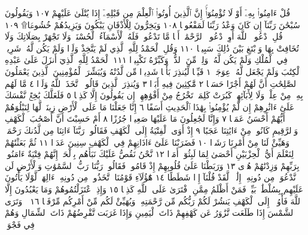قُلْ ءَامِنُوا۟ بِهِۦٓ أَوْ لَا تُؤْمِنُوٓا۟ۚ إِنَّ ٱلَّذِينَ أُوتُوا۟ ٱلْعِلْمَ مِن قَبْلِهِۦٓ إِذَا يُتْلَىٰ
عَلَيْهِمْ  ١٠٧ وَيَقُولُونَ سُبْحَٰنَ رَبِّنَآ إِن كَانَ
وَعْدُ رَبِّنَا لَمَفْعُولࣰا ١٠٨ وَيَخِرُّونَ لِلْأَذْقَانِ يَبْكُونَ وَيَزِيدُهُمْ
خُشُوعࣰا۩ ١٠٩ قُلِ ٱدْعُوا۟ ٱللَّهَ أَوِ ٱدْعُوا۟ ٱلرَّحْمَٰنَۖ أَيࣰّا مَّا تَدْعُوا۟ فَلَهُ
ٱلْأَسْمَآءُ ٱلْحُسْنَىٰۚ وَلَا تَجْهَرْ بِصَلَاتِكَ وَلَا تُخَافِتْ بِهَا وَٱبْتَغِ
بَيْنَ ذَٰلِكَ سَبِيلࣰا ١١٠ وَقُلِ ٱلْحَمْدُ لِلَّهِ ٱلَّذِي لَمْ يَتَّخِذْ وَلَدࣰا وَلَمْ يَكُن
لَّهُۥ شَرِيكࣱ فِي ٱلْمُلْكِ وَلَمْ يَكُن لَّهُۥ وَلِيࣱّ مِّنَ ٱلذُّلِّۖ وَكَبِّرْهُ تَكْبِيرَۢا ١١١
ٱلْحَمْدُ لِلَّهِ ٱلَّذِيٓ أَنزَلَ عَلَىٰ عَبْدِهِ ٱلْكِتَٰبَ وَلَمْ يَجْعَل لَّهُۥ عِوَجَاۜ ١
قَيِّمࣰا لِّيُنذِرَ بَأْسࣰا شَدِيدࣰا مِّن لَّدُنْهُ وَيُبَشِّرَ ٱلْمُؤْمِنِينَ
ٱلَّذِينَ يَعْمَلُونَ ٱلصَّٰلِحَٰتِ أَنَّ لَهُمْ أَجْرًا حَسَنࣰا ٢
مَّٰكِثِينَ فِيهِ أَبَدࣰا ٣ وَيُنذِرَ ٱلَّذِينَ قَالُوا۟ ٱتَّخَذَ ٱللَّهُ وَلَدࣰا ٤
مَّا لَهُم بِهِۦ مِنْ عِلْمࣲ وَلَا لِأٓبَآئِهِمْۚ كَبُرَتْ كَلِمَةࣰ تَخْرُجُ مِنْ
أَفْوَٰهِهِمْۚ إِن يَقُولُونَ إِلَّا كَذِبࣰا ٥ فَلَعَلَّكَ بَٰخِعࣱ نَّفْسَكَ
عَلَىٰٓ ءَاثَٰرِهِمْ إِن لَّمْ يُؤْمِنُوا۟ بِهَٰذَا ٱلْحَدِيثِ أَسَفًا ٦ إِنَّا
جَعَلْنَا مَا عَلَى ٱلْأَرْضِ زِينَةࣰ لَّهَا لِنَبْلُوَهُمْ أَيُّهُمْ أَحْسَنُ عَمَلࣰا ٧
وَإِنَّا لَجَٰعِلُونَ مَا عَلَيْهَا صَعِيدࣰا جُرُزًا ٨ أَمْ حَسِبْتَ
أَنَّ أَصْحَٰبَ ٱلْكَهْفِ وَٱلرَّقِيمِ كَانُوا۟ مِنْ ءَايَٰتِنَا عَجَبًا ٩
إِذْ أَوَى ٱلْفِتْيَةُ إِلَى ٱلْكَهْفِ فَقَالُوا۟ رَبَّنَآ ءَاتِنَا مِن لَّدُنكَ
رَحْمَةࣰ وَهَيِّئْ لَنَا مِنْ أَمْرِنَا رَشَدࣰا ١٠ فَضَرَبْنَا عَلَىٰٓ ءَاذَانِهِمْ
فِي ٱلْكَهْفِ سِنِينَ عَدَدࣰا ١١ ثُمَّ بَعَثْنَٰهُمْ لِنَعْلَمَ أَيُّ
ٱلْحِزْبَيْنِ أَحْصَىٰ لِمَا لَبِثُوٓا۟ أَمَدࣰا ١٢ نَّحْنُ نَقُصُّ عَلَيْكَ نَبَأَهُم
بِٱلْحَقِّۚ إِنَّهُمْ فِتْيَةٌ ءَامَنُوا۟ بِرَبِّهِمْ وَزِدْنَٰهُمْ هُدࣰى ١٣
وَرَبَطْنَا عَلَىٰ قُلُوبِهِمْ إِذْ قَامُوا۟ فَقَالُوا۟ رَبُّنَا رَبُّ ٱلسَّمَٰوَٰتِ
وَٱلْأَرْضِ لَن نَّدْعُوَا۟ مِن دُونِهِۦٓ إِلَٰهࣰاۖ لَّقَدْ قُلْنَآ إِذࣰا شَطَطًا ١٤
هَٰٓؤُلَآءِ قَوْمُنَا ٱتَّخَذُوا۟ مِن دُونِهِۦٓ ءَالِهَةࣰۖ لَّوْلَا يَأْتُونَ عَلَيْهِم
بِسُلْطَٰنِۭ بَيِّنࣲۖ فَمَنْ أَظْلَمُ مِمَّنِ ٱفْتَرَىٰ عَلَى ٱللَّهِ كَذِبࣰا ١٥
وَإِذِ ٱعْتَزَلْتُمُوهُمْ وَمَا يَعْبُدُونَ إِلَّا ٱللَّهَ فَأْوُۥٓا۟ إِلَى ٱلْكَهْفِ
يَنشُرْ لَكُمْ رَبُّكُم مِّن رَّحْمَتِهِۦ وَيُهَيِّئْ لَكُم مِّنْ أَمْرِكُم مِّرْفَقࣰا ١٦
۞ وَتَرَى ٱلشَّمْسَ إِذَا طَلَعَت تَّزَٰوَرُ عَن كَهْفِهِمْ ذَاتَ
ٱلْيَمِينِ وَإِذَا غَرَبَت تَّقْرِضُهُمْ ذَاتَ ٱلشِّمَالِ وَهُمْ فِي فَجْوَةࣲ
